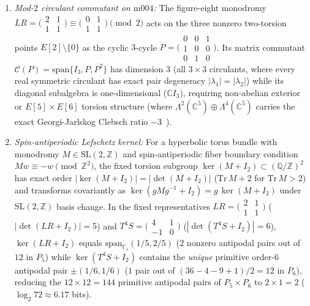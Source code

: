 \documentclass[aps,prd,twocolumn,nofootinbib,floatfix]{revtex4-2}
\begin{document}
\begin{enumerate}
    \item \emph{Mod-$2$ circulant commutant on $\mathrm{m004}$:} The figure-eight monodromy $LR = \bigl(\begin{smallmatrix}2&1\\1&1\end{smallmatrix}\bigr) \equiv \bigl(\begin{smallmatrix}0&1\\1&1\end{smallmatrix}\bigr) \pmod 2$ acts on the three nonzero two-torsion points $E[2]\setminus\{0\}$ as the cyclic $3$-cycle $P = \bigl(\begin{smallmatrix}0&0&1\\1&0&0\\0&1&0\end{smallmatrix}\bigr)$. Its matrix commutant $\mathcal{C}(P) = \mathrm{span}\{I_3, P, P^2\}$ has dimension $3$ (all $3\times 3$ circulants, where every real symmetric circulant has exact pair degeneracy $|\lambda_1| = |\lambda_2|$) while its diagonal subalgebra is one-dimensional ($\mathbb{C}I_3$), requiring non-abelian exterior or $E[5]\times E[6]$ torsion structure (where $\Lambda^2(\mathbb{C}^5)\oplus\Lambda^4(\mathbb{C}^5)$ carries the exact Georgi-Jarlskog Clebsch ratio $-3$~\cite{GeorgiJarlskog1979}).
    \item \emph{Spin-antiperiodic Lefschetz kernel:} For a hyperbolic torus bundle with monodromy $M \in \mathrm{SL}(2,\mathbb{Z})$ and spin-antiperiodic fiber boundary condition $M w \equiv -w \pmod{\mathbb{Z}^2}$, the fixed torsion subgroup $\ker(M + I_2) \subset (\mathbb{Q}/\mathbb{Z})^2$ has exact order $|\ker(M + I_2)| = |\det(M + I_2)|$ ($\mathrm{Tr}\,M + 2$ for $\mathrm{Tr}\,M > 2$) and transforms covariantly as $\ker(g M g^{-1} + I_2) = g\,\ker(M + I_2)$ under $\mathrm{SL}(2,\mathbb{Z})$ basis change. In the fixed representatives $LR = \bigl(\begin{smallmatrix}2&1\\1&1\end{smallmatrix}\bigr)$ ($|\det(LR+I_2)| = 5$) and $T^4 S = \bigl(\begin{smallmatrix}4&1\\-1&0\end{smallmatrix}\bigr)$ ($|\det(T^4 S + I_2)| = 6$), $\ker(LR + I_2)$ equals $\mathrm{span}_{\mathbb{F}_5}(1/5, 2/5)$ ($2$ nonzero antipodal pairs out of $12$ in $P_5$) while $\ker(T^4 S + I_2)$ contains the \emph{unique} primitive order-$6$ antipodal pair $\pm(1/6, 1/6)$ ($1$ pair out of $(36 - 4 - 9 + 1)/2 = 12$ in $P_6$), reducing the $12\times 12 = 144$ primitive antipodal pairs of $P_5 \times P_6$ to $2 \times 1 = 2$ ($\log_2 72 \approx 6.17$ bits).
\end{enumerate}
\end{document}
